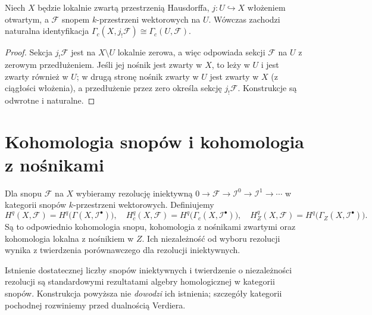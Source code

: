 \begin{stwierdzenie}
\label{prop:jbang-sections-v12}
Niech $X$ będzie lokalnie zwartą przestrzenią Hausdorffa,
$j:U\hookrightarrow X$ włożeniem otwartym,
a $\mathcal F$ snopem $k$-przestrzeni wektorowych na $U$.
Wówczas zachodzi naturalna identyfikacja
$\Gamma_c(X,j_!\mathcal F)\cong\Gamma_c(U,\mathcal F)$.
\end{stwierdzenie}
\begin{proof}
Sekcja $j_!\mathcal F$ jest na $X\setminus U$ lokalnie zerowa,
a więc odpowiada sekcji $\mathcal F$ na $U$ z zerowym przedłużeniem.
Jeśli jej nośnik jest zwarty w $X$, to leży w $U$ i jest
zwarty również w $U$; w drugą stronę nośnik zwarty w $U$
jest zwarty w $X$ (z ciągłości włożenia), a przedłużenie
przez zero określa sekcję $j_!\mathcal F$.
Konstrukcje są odwrotne i naturalne.
\end{proof}

\section{Kohomologia snopów i kohomologia z nośnikami}
\begin{definicja}
\label{def:sheaf-cohom-v12}
Dla snopu $\mathcal F$ na $X$ wybieramy rezolucję iniektywną
$0\to\mathcal F\to\mathcal I^0\to\mathcal I^1\to\cdots$
w kategorii snopów $k$-przestrzeni wektorowych. Definiujemy
\[
H^q(X,\mathcal F)=H^q\bigl(\Gamma(X,\mathcal I^\bullet)\bigr),
\quad H_c^q(X,\mathcal F)
=H^q\bigl(\Gamma_c(X,\mathcal I^\bullet)\bigr),
\quad H_Z^q(X,\mathcal F)
=H^q\bigl(\Gamma_Z(X,\mathcal I^\bullet)\bigr).
\]
Są to odpowiednio kohomologia snopu, kohomologia z nośnikami
zwartymi oraz kohomologia lokalna z nośnikiem w $Z$.
Ich niezależność od wyboru rezolucji wynika z twierdzenia
porównawczego dla rezolucji iniektywnych.
\end{definicja}

\begin{uwaga}
Istnienie dostatecznej liczby snopów iniektywnych i twierdzenie
o niezależności rezolucji są standardowymi rezultatami
algebry homologicznej w kategorii snopów. Konstrukcja powyższa
nie \emph{dowodzi} ich istnienia; szczegóły kategorii
pochodnej rozwiniemy przed dualnością Verdiera.
\end{uwaga}

